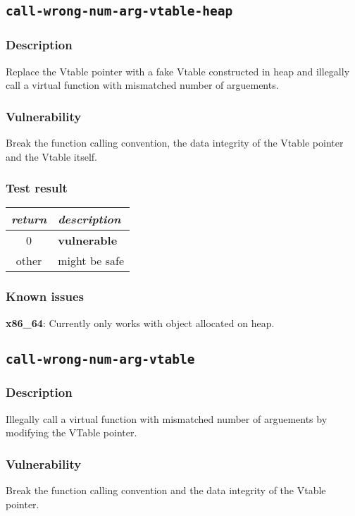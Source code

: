 \documentclass[a4paper]{book}
\begin{document}
\subsection{\texttt{call-wrong-num-arg-vtable-heap}}\label{test-call-wrong-num-arg-vtable-heap}

\subsubsection{Description}
Replace the Vtable pointer with a fake Vtable constructed in heap and
illegally call a virtual function with mismatched number of arguements.

\subsubsection{Vulnerability}
Break the function calling convention, the data integrity of the Vtable pointer and the Vtable itself.

\subsubsection{Test result}
\begin{tabular}{cl}
  \toprule
  \emph{return}  & \emph{description} \\
  \midrule
  0              & \textbf{vulnerable} \\
  other          & might be safe \\
  \bottomrule
\end{tabular}

\subsubsection{Known issues}

\textbf{x86\_64}: Currently only works with object allocated on heap.


\newpage
\subsection{\texttt{call-wrong-num-arg-vtable}}\label{test-call-wrong-num-arg-vtable}

\subsubsection{Description}
Illegally call a virtual function with mismatched number of arguements by modifying the VTable pointer.

\subsubsection{Vulnerability}
Break the function calling convention and the data integrity of the Vtable pointer.
\end{document}
